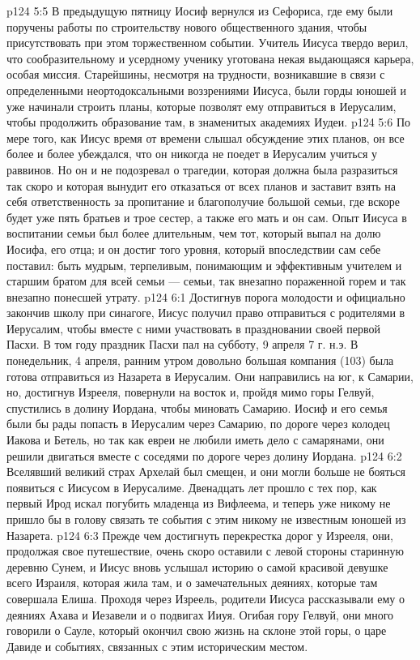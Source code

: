 \vs p124 5:5 В предыдущую пятницу Иосиф вернулся из Сефориса, где ему были поручены работы по строительству нового общественного здания, чтобы присутствовать при этом торжественном событии. Учитель Иисуса твердо верил, что сообразительному и усердному ученику уготована некая выдающаяся карьера, особая миссия. Старейшины, несмотря на трудности, возникавшие в связи с определенными неортодоксальными воззрениями Иисуса, были горды юношей и уже начинали строить планы, которые позволят ему отправиться в Иерусалим, чтобы продолжить образование там, в знаменитых академиях Иудеи.
\vs p124 5:6 По мере того, как Иисус время от времени слышал обсуждение этих планов, он все более и более убеждался, что он никогда не поедет в Иерусалим учиться у раввинов. Но он и не подозревал о трагедии, которая должна была разразиться так скоро и которая вынудит его отказаться от всех планов и заставит взять на себя ответственность за пропитание и благополучие большой семьи, где вскоре будет уже пять братьев и трое сестер, а также его мать и он сам. Опыт Иисуса в воспитании семьи был более длительным, чем тот, который выпал на долю Иосифа, его отца; и он достиг того уровня, который впоследствии сам себе поставил: быть мудрым, терпеливым, понимающим и эффективным учителем и старшим братом для всей семьи --- семьи, так внезапно пораженной горем и так внезапно понесшей утрату.
\vs p124 6:1 Достигнув порога молодости и официально закончив школу при синагоге, Иисус получил право отправиться с родителями в Иерусалим, чтобы вместе с ними участвовать в праздновании своей первой Пасхи. В том году праздник Пасхи пал на субботу, 9 апреля 7 г. н.э. В понедельник, 4 апреля, ранним утром довольно большая компания (103) была готова отправиться из Назарета в Иерусалим. Они направились на юг, к Самарии, но, достигнув Изрееля, повернули на восток и, пройдя мимо горы Гелвуй, спустились в долину Иордана, чтобы миновать Самарию. Иосиф и его семья были бы рады попасть в Иерусалим через Самарию, по дороге через колодец Иакова и Бетель, но так как евреи не любили иметь дело с самарянами, они решили двигаться вместе с соседями по дороге через долину Иордана.
\vs p124 6:2 Вселявший великий страх Архелай был смещен, и они могли больше не бояться появиться с Иисусом в Иерусалиме. Двенадцать лет прошло с тех пор, как первый Ирод искал погубить младенца из Вифлеема, и теперь уже никому не пришло бы в голову связать те события с этим никому не известным юношей из Назарета.
\vs p124 6:3 Прежде чем достигнуть перекрестка дорог у Изрееля, они, продолжая свое путешествие, очень скоро оставили с левой стороны старинную деревню Сунем, и Иисус вновь услышал историю о самой красивой девушке всего Израиля, которая жила там, и о замечательных деяниях, которые там совершала Елиша. Проходя через Изреель, родители Иисуса рассказывали ему о деяниях Ахава и Иезавели и о подвигах Ииуя. Огибая гору Гелвуй, они много говорили о Сауле, который окончил свою жизнь на склоне этой горы, о царе Давиде и событиях, связанных с этим историческим местом.
